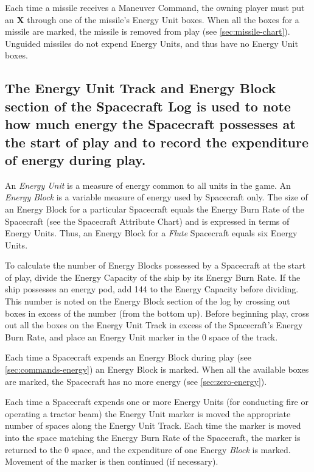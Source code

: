Each time a missile receives a Maneuver Command, the owning player
must put an \textbf{\textsf{X}} through one of the missile's Energy Unit boxes.
When all the boxes for a missile are marked, the missile is removed
from play (see \ref{sec:missile-chart}). Unguided missiles do not
expend Energy Units, and thus have no Energy Unit boxes.



\subsection[Energy Unit Track And Energy Block Section]{The Energy
  Unit Track and Energy Block section of the Spacecraft Log is used to
  note how much energy  
the Spacecraft possesses at the start of play and to record the
expenditure of energy during play.}
\label{sec:energy-unit-track}


An \emph{Energy Unit} is a measure of energy common to all units in
the game. An \emph{Energy Block} is a variable measure of energy used
by Spacecraft only. The size of an Energy Block for a particular
Spacecraft equals the Energy Burn Rate of the Spacecraft (see the
Spacecraft Attribute Chart) and is expressed in terms of Energy Units.
Thus, an Energy Block for a \emph{Flute} Spacecraft equals six Energy
Units.

To calculate the number of Energy Blocks possessed by a Spacecraft at
the start of play, divide the Energy Capacity of the ship by its
Energy Burn Rate. If the ship possesses an energy pod, add 144 to the
Energy Capacity before dividing. This number is noted on the Energy
Block section of the log by crossing out boxes in excess of the number
(from the bottom up).  Before beginning play, cross out all the boxes
on the Energy Unit Track in excess of the Spacecraft's Energy Burn
Rate, and place an Energy Unit marker in the 0 space of the track.

Each time a Spacecraft expends an Energy Block during play (see
\ref{sec:commands-energy}) an Energy Block is marked. When all the
available boxes are marked, the Spacecraft has no more energy (see
\ref{sec:zero-energy}).

Each time a Spacecraft expends one or more Energy Units (for
conducting fire or operating a tractor beam) the Energy Unit marker is
moved the appropriate number of spaces along the Energy Unit Track.
Each time the marker is moved into the space matching the Energy Burn
Rate of the Spacecraft, the marker is returned to the 0 space, and the
expenditure of one Energy \emph{Block} is marked.  Movement of the
marker is then continued (if necessary).


